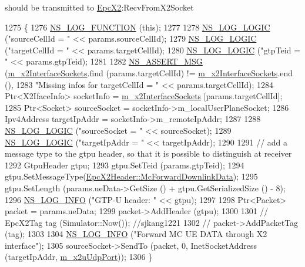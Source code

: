 should be transmitted to \hyperlink{classns3_1_1EpcX2}{Epc\+X2}\+:Recv\+From\+X2\+Socket 
\begin{DoxyCode}
1275 \{
1276   \hyperlink{log-macros-disabled_8h_a90b90d5bad1f39cb1b64923ea94c0761}{NS\_LOG\_FUNCTION} (\textcolor{keyword}{this});
1277 
1278   \hyperlink{group__logging_ga88acd260151caf2db9c0fc84997f45ce}{NS\_LOG\_LOGIC} (\textcolor{stringliteral}{"sourceCellId = "} << params.sourceCellId);
1279   \hyperlink{group__logging_ga88acd260151caf2db9c0fc84997f45ce}{NS\_LOG\_LOGIC} (\textcolor{stringliteral}{"targetCellId = "} << params.targetCellId);
1280   \hyperlink{group__logging_ga88acd260151caf2db9c0fc84997f45ce}{NS\_LOG\_LOGIC} (\textcolor{stringliteral}{"gtpTeid = "} << params.gtpTeid);
1281 
1282   \hyperlink{assert_8h_aff5ece9066c74e681e74999856f08539}{NS\_ASSERT\_MSG} (\hyperlink{classns3_1_1EpcX2_a0665276228b9b99a52ef6d5e9bdb306d}{m\_x2InterfaceSockets}.find (params.targetCellId) != 
      \hyperlink{classns3_1_1EpcX2_a0665276228b9b99a52ef6d5e9bdb306d}{m\_x2InterfaceSockets}.end (),
1283                  \textcolor{stringliteral}{"Missing infos for targetCellId = "} << params.targetCellId);
1284   Ptr<X2IfaceInfo> socketInfo = \hyperlink{classns3_1_1EpcX2_a0665276228b9b99a52ef6d5e9bdb306d}{m\_x2InterfaceSockets} [params.targetCellId];
1285   Ptr<Socket> sourceSocket = socketInfo->m\_localUserPlaneSocket;
1286   Ipv4Address targetIpAddr = socketInfo->m\_remoteIpAddr;
1287 
1288   \hyperlink{group__logging_ga88acd260151caf2db9c0fc84997f45ce}{NS\_LOG\_LOGIC} (\textcolor{stringliteral}{"sourceSocket = "} << sourceSocket);
1289   \hyperlink{group__logging_ga88acd260151caf2db9c0fc84997f45ce}{NS\_LOG\_LOGIC} (\textcolor{stringliteral}{"targetIpAddr = "} << targetIpAddr);
1290 
1291   \textcolor{comment}{// add a message type to the gtpu header, so that it is possible to distinguish at receiver}
1292   GtpuHeader gtpu;
1293   gtpu.SetTeid (params.gtpTeid);
1294   gtpu.SetMessageType(\hyperlink{classns3_1_1EpcX2Header_a0e69b043a20eaee4c570f223f4eca715a8a0607f112abe862244717f789ea9ba8}{EpcX2Header::McForwardDownlinkData});
1295   gtpu.SetLength (params.ueData->GetSize () + gtpu.GetSerializedSize () - 8); 
1296   \hyperlink{group__logging_gafbd73ee2cf9f26b319f49086d8e860fb}{NS\_LOG\_INFO} (\textcolor{stringliteral}{"GTP-U header: "} << gtpu);
1297 
1298   Ptr<Packet> packet = params.ueData;
1299   packet->AddHeader (gtpu);
1300 
1301 \textcolor{comment}{//  EpcX2Tag tag (Simulator::Now()); //sjkang1221}
1302  \textcolor{comment}{// packet->AddPacketTag (tag);}
1303 
1304   \hyperlink{group__logging_gafbd73ee2cf9f26b319f49086d8e860fb}{NS\_LOG\_INFO} (\textcolor{stringliteral}{"Forward MC UE DATA through X2 interface"});
1305   sourceSocket->SendTo (packet, 0, InetSocketAddress (targetIpAddr, \hyperlink{classns3_1_1EpcX2_aa0e3b62bf699a12b65309cb25f232974}{m\_x2uUdpPort}));  
1306 \}
\end{DoxyCode}


